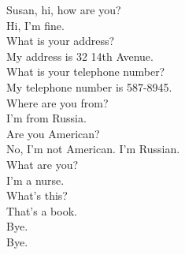 \ex
\dialt Susan, hi, how are you?\\
\dials Hi, I'm fine.\\
\dialt What is your address?\\
\dials My address is 32 14th Avenue.\\
\dialt What is your telephone number?\\
\dials My telephone number is 587-8945.\\
\dialt Where are you from?\\
\dials I'm from Russia.\\
\dialt Are you American?\\
\dials No, I'm not American. I'm Russian.\\
\dialt What are you?\\
\dials I'm a nurse.\\
\dialt What's this?\\
\dials That's a book.\\
\dialt Bye.\\
\dials Bye.
\xe